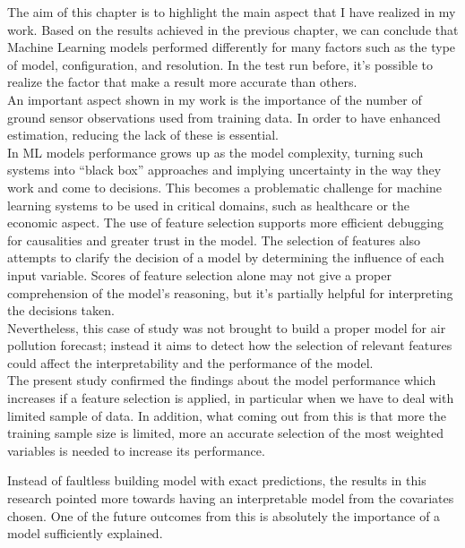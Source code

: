 The aim of this chapter is to highlight the main aspect that I have realized in my work.
Based on the results achieved in the previous chapter, we can conclude that Machine Learning models performed differently for many factors such as the type of model, configuration, and resolution.
In the test run before, it's possible to realize the factor that make a result more accurate than others.\\
An important aspect shown in my work is the importance of the number of ground sensor observations used from training data. In order to have enhanced estimation, reducing the lack of these is essential.\\
In ML models performance grows up as the model complexity, turning such systems into “black box” approaches and implying uncertainty in the way they work and come to decisions. 
This becomes a problematic challenge for machine learning systems to be used in critical domains, such as healthcare or the economic aspect.
The use of feature selection supports more efficient debugging for causalities and greater trust in the model.
The selection of features also attempts to clarify the decision of a model by determining the influence of each input variable. 
Scores of feature selection alone may not give a proper comprehension of the model’s reasoning, but it's partially helpful for interpreting the decisions taken.\\
Nevertheless, this case of study was not brought to build a proper model for air pollution forecast; instead it aims to detect how the selection of relevant features could affect the interpretability and the performance of the model. \\
The present study confirmed the findings about the model performance which increases if a feature selection is applied, in particular when we have to deal with limited sample of data\cite{vabalas2019machine}. 
In addition, what coming out from this is that more the training sample size is limited, more an accurate selection of the most weighted variables is needed to increase its performance.
\begin{comment}
In this work, so it is highlighted the effect of how the training in ML should benefit from an accurate selection of variable. 
\end{comment}
Instead of faultless building model with exact predictions, the results in this research pointed more towards having an interpretable model from the covariates chosen. 
One of the future outcomes from this is absolutely the importance of a model sufficiently explained.
